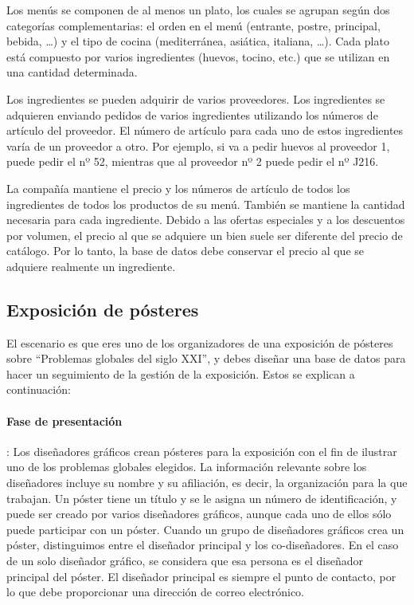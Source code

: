 \documentclass{db-practice}
\begin{document}
Los menús se componen de al menos un plato, los cuales se agrupan según dos categorías complementarias: el orden en el menú (entrante, postre, principal, bebida, \ldots) y el tipo de cocina (mediterránea, asiática, italiana, \ldots). Cada plato está compuesto por varios ingredientes (huevos, tocino, etc.) que se utilizan en una cantidad determinada.

Los ingredientes se pueden adquirir de varios proveedores. Los ingredientes se adquieren enviando pedidos de varios ingredientes utilizando los números de artículo del proveedor. El número de artículo para cada uno de estos ingredientes varía de un proveedor a otro. Por ejemplo, si va a pedir huevos al proveedor 1, puede pedir el nº 52, mientras que al proveedor nº 2 puede pedir el nº J216. 

La compañía mantiene el precio y los números de artículo de todos los ingredientes de todos los productos de su menú. También se mantiene la cantidad necesaria para cada ingrediente. Debido a las ofertas especiales y a los descuentos por volumen, el precio al que se adquiere un bien suele ser diferente del precio de catálogo. Por lo tanto, la base de datos debe conservar el precio al que se adquiere realmente un ingrediente.

\subsection{Exposición de pósteres}

El escenario es que eres uno de los organizadores de una exposición de pósteres sobre ``Problemas globales del siglo XXI'', y debes diseñar una base de datos para hacer un seguimiento de la gestión de la exposición.  Estos se explican a continuación:

\paragraph{Fase de presentación}: Los diseñadores gráficos crean pósteres para la exposición con el fin de ilustrar uno de los problemas globales elegidos.  La información relevante sobre los diseñadores incluye su nombre y su afiliación, es decir, la organización para la que trabajan.  Un póster tiene un título y se le asigna un número de identificación, y puede ser creado por varios diseñadores gráficos, aunque cada uno de ellos sólo puede participar con un póster.  Cuando un grupo de diseñadores gráficos crea un póster, distinguimos entre el diseñador principal y los co-diseñadores.  En el caso de un solo diseñador gráfico, se considera que esa persona es el diseñador principal del póster.  El diseñador principal es siempre el punto de contacto, por lo que debe proporcionar una dirección de correo electrónico.
\end{document}
